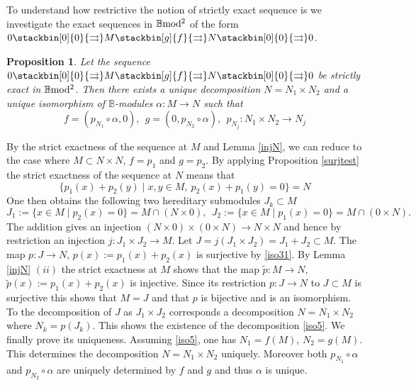 \documentclass[12pt]{article}
\newtheorem{prop}[thm]{Proposition}
\def\B{{\mathbb B}}
\def\strg{strict }
\def\strgly{strictly }
\def\bm2{{\rm \B mod^2}}
\begin{document}
 To understand how restrictive the notion of  \strgly exact sequence is we investigate the exact sequences in $\bm2$ of the form $0 \stackbin[0]{0}{\rightrightarrows}M\stackbin[g]{f}{\rightrightarrows}N\stackbin[0]{0}{\rightrightarrows}0$. 
 \begin{prop}\label{iso4}  Let the sequence $0 \stackbin[0]{0}{\rightrightarrows}M\stackbin[g]{f}{\rightrightarrows}N\stackbin[0]{0}{\rightrightarrows}0$ be  \strgly exact in $\bm2$. \newline
 Then there exists a unique decomposition $N=N_1\times N_2$ and a unique isomorphism of $\B$-modules $\alpha:M\to N$ such that 
 \begin{equation}
 	\label{iso5}
 f=(p_{N_1}\circ \alpha,0), \ \ g=(0,p_{N_2}\circ \alpha), \ \ p_{N_j}:N_1\times N_2\to N_j
 \end{equation}	
 \end{prop}
\proof By the \strg exactness of the sequence at $M$ and Lemma \ref{injN}, we can reduce to the case where $M\subset N\times N$, $f=p_1$ and $g=p_2$. By applying  Proposition \ref{surjtest} the \strg exactness of the sequence at $N$ means that 
\begin{equation}
 	\label{iso31}
\{p_1(x)+p_2(y)\mid x,y\in M, \ p_2(x)+p_1(y)=0\}=N
\end{equation}
 One then obtains the following two hereditary submodules $J_k\subset M$
$$
J_1:=\{x\in M\mid p_2(x)=0\}= M\cap (N\times 0), \ \ 
J_2:=\{x\in M\mid p_1(x)=0\}= M\cap (0\times N).
$$
The addition gives an injection $(N\times 0)\times (0\times N)\to N\times N$ and hence by restriction an injection $j:J_1\times J_2\to M$. Let $J=j(J_1\times J_2)=J_1+J_2\subset M$. The map $p:J\to N$, $p(x):=p_1(x) +p_2(x)$ is surjective  by \eqref{iso31}. By Lemma \ref{injN} $(ii)$ the \strg exactness at $M$ shows that the map $\tilde p:M\to N$, $\tilde p(x):=p_1(x) +p_2(x)$ is injective. Since its restriction $p:J\to N$ to $J\subset M$ is surjective this shows that $M=J$ and that $p$ is bijective and is an isomorphism.  To the decomposition of $J$ as $J_1\times J_2$ corresponds a decomposition $N=N_1\times N_2$ where $N_k=p(J_k)$.  This shows the existence of the decomposition \eqref{iso5}. We finally prove its uniqueness. Assuming \eqref{iso5}, one has $N_1=f(M)$, $N_2=g(M)$. This determines the decomposition $N=N_1\times N_2$ uniquely. Moreover both $p_{N_1}\circ \alpha$ and $p_{N_2}\circ \alpha$ are uniquely determined by $f$ and $g$ and thus $\alpha$ is unique.
\end{document}
